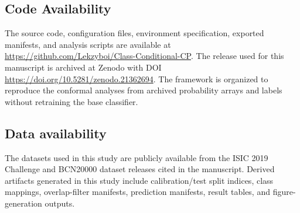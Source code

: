 ﻿\documentclass[preprint,12pt]{elsarticle}
\begin{document}
\subsection*{Code Availability}
The source code, configuration files, environment specification, exported manifests, and analysis scripts are available at \url{https://github.com/Lekzyboi/Class-Conditional-CP}. The release used for this manuscript is archived at Zenodo with DOI \url{https://doi.org/10.5281/zenodo.21362694}. The framework is organized to reproduce the conformal analyses from archived probability arrays and labels without retraining the base classifier.

\subsection*{Data availability}
The datasets used in this study are publicly available from the ISIC 2019 Challenge and BCN20000 dataset releases cited in the manuscript. Derived artifacts generated in this study include calibration/test split indices, class mappings, overlap-filter manifests, prediction manifests, result tables, and figure-generation outputs.



\end{document}
